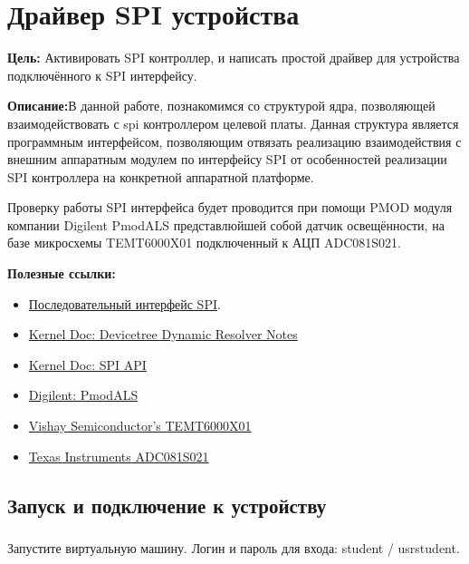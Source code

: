 \chapter{Драйвер SPI устройства}
\textbf{Цель:} Активировать SPI контроллер, и написать простой драйвер для устройства подключённого к SPI интерфейсу.

\vspace{5mm}
\textbf{Описание:}В данной работе, познакомимся со структурой ядра, позволяющей взаимодействовать с spi контроллером целевой платы. Данная структура является программным интерфейсом, позволяющим отвязать реализацию взаимодействия с внешним аппаратным модулем по интерфейсу SPI от особенностей реализации SPI контроллера на конкретной аппаратной платформе.

Проверку работы SPI интерфейса будет проводится при помощи PMOD модуля компании Digilent PmodALS представлюйшей собой датчик освещённости, на базе микросхемы TEMT6000X01 подключенный к АЦП ADC081S021.

\vspace{5mm}
\textbf{Полезные ссылки:}
\begin{itemize}
	\item \href{http://www.gaw.ru/html.cgi/txt/interface/spi/index.htm}{Последовательный интерфейс SPI}.
	\item \href{https://docs.kernel.org/devicetree/dynamic-resolution-notes.html}{Kernel Doc: Devicetree Dynamic Resolver Notes}
	\item \href{https://www.kernel.org/doc/html/v4.15/driver-api/spi.html}{Kernel Doc: SPI API}	
	\item \href{https://digilent.com/reference/pmod/pmodals/start}{Digilent: PmodALS}
	\item \href{https://www.vishay.com/docs/81579/temt6000.pdf}{Vishay Semiconductor's TEMT6000X01}
	\item \href{https://datasheetspdf.com/pdf-file/1407102/etcTI/ADC081S021/1}{Texas Instruments ADC081S021}
\end{itemize}


\section{Запуск и подключение к устройству}

\subsection{}Запустите виртуальную машину. Логин и пароль для входа: student / usrstudent.

